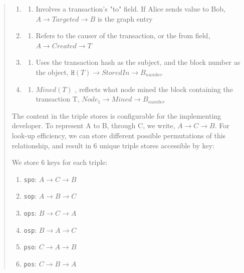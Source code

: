 \documentclass[12pt, titlepage, twocolumn]{report}
\begin{document}
\begin{quotation}
\begin{enumerate}
	\item \texttt{}
	\begin{enumerate}
		\item Involves a transaction's "to" field. If Alice sends value to Bob, \(A \rightarrow Targeted \rightarrow B\) is the graph entry
	\end{enumerate}
	\item \texttt{}
	\begin{enumerate}
		\item Refers to the causer of the transaction, or the from field, \(A \rightarrow Created \rightarrow T\)
	\end{enumerate}
	\item \texttt{}
	\begin{enumerate}
		\item  Uses the transaction hash as the subject, and the block number as the object, \(\texttt{H}(T) \rightarrow StoredIn \rightarrow B_{number}\)
	\end{enumerate}
	\item \texttt{}
	\begin{enumerate}
		\item \(Mined(T)\) , reflects what node mined the block containing the transaction T, \(Node_1 \rightarrow Mined \rightarrow B_{number}\)
	\end{enumerate}
\end{enumerate}

The content in the triple stores is configurable for the implementing developer. To represent A to B, through C, we write, \(A \rightarrow C \rightarrow B\). For look-up efficiency, we can store different possible permutations of this relationship, and result in 6 unique triple stores accessible by key: 

We store 6 keys for each triple:
\begin{enumerate}
	\item \texttt{spo}: \(A \rightarrow C \rightarrow B\)
	\item \texttt{sop}: \(A \rightarrow B \rightarrow C\)
	\item \texttt{ops}: \(B \rightarrow C \rightarrow A\)
	\item \texttt{osp}: \(B \rightarrow A \rightarrow C\)
	\item \texttt{pso}: \(C \rightarrow A \rightarrow B\)
	\item \texttt{pos}: \(C \rightarrow B \rightarrow A\)
\end{enumerate}


\end{quotation}
\end{document}

